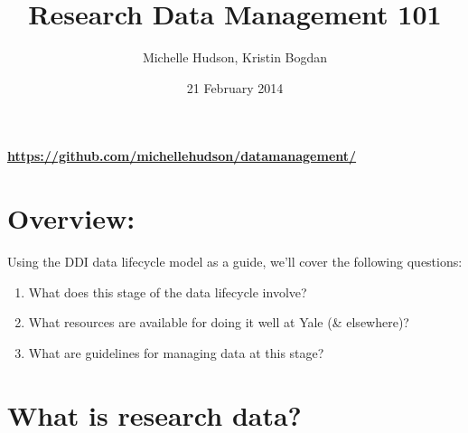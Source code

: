 \documentclass{tufte-handout}
\title{Research Data Management 101}
\author[Michelle Hudson, Kristin Bogdan]{Michelle Hudson, Kristin Bogdan}
\date{21 February 2014}  %
\begin{document}
\maketitle%
\paragraph{\url{https://github.com/michellehudson/datamanagement/}}\label{httpsgithub.commichellehudsondatamanagement} 

\section{Overview:}\label{overview}
Using the DDI data lifecycle model as a guide, we'll cover the following
questions: 

\begin{enumerate}
\def\labelenumi{\arabic{enumi}.}
\itemsep1pt\parskip0pt
\item
  What does this stage of the data lifecycle involve?
\item
  What resources are available for doing it well at Yale (\& elsewhere)?
\item
  What are guidelines for managing data at this stage?
\end{enumerate}


\section{What is research data?}\label{what-is-research-data}
\end{document}

